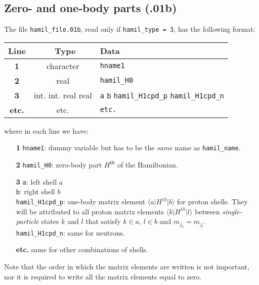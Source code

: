 \documentclass[a4paper,11pt]{article}
\renewcommand{\tt}[1]{\texttt{#1}}
\newcommand{\bra}[1]{\langle #1 \vert}
\newcommand{\ket}[1]{\vert #1 \rangle}
\newcommand{\elma}[3]{\bra{#1} #2 \ket{#3}}
\begin{document}
\subsection{Zero- and one-body parts (.01b)}

The file \tt{hamil\_file.01b}, read only if \tt{hamil\_type = 3}, has the following format: 
\begin{center}
\begin{tabular}{|c|c|l|}
\hline
Line & \ Type \hfill & Data \\
\hline
\textbf{1}    & character         & \tt{hname1} \\
\textbf{2}    & real              & \tt{hamil\_H0} \\
\textbf{3}    & int. int. real real & \tt{a} \:\tt{b} \:\tt{hamil\_H1cpd\_p} \:\tt{hamil\_H1cpd\_n} \\
\textbf{etc.} &     etc.          &        \phantom{000000} \tt{etc.}  \\
\hline
\end{tabular}
\end{center}
where in each line we have:
\begin{itemize}
\item[\textbf{1}] \tt{hname1}: dummy variable but has to be the \emph{same} name as \tt{hamil\_name}.
\item[\textbf{2}] \tt{hamil\_H0}: zero-body part $H^{0b}$ of the Hamiltonian.
\item[\textbf{3}] \tt{a}: left shell $a$ \\
                  \tt{b}: right shell $b$ \\
                  \tt{hamil\_H1cpd\_p}: one-body matrix element $\elma{a}{H^{1b}}{b}$ for proton shells. 
                  They will be attributed to all proton matrix elements $\elma{k}{H^{1b}}{l}$
                  between \emph{single-particle} states $k$ and $l$ that satisfy $k \in a$, $l \in b$ and $m_{j_k} = m_{j_l}$. \\
                  \tt{hamil\_H1cpd\_n}: same for neutrons.
\item[\textbf{etc.}] same for other combinations of shells.
\end{itemize}
Note that the order in which the matrix elements are written is not important, nor it is required to write all the matrix elements equal to zero.
\end{document}
